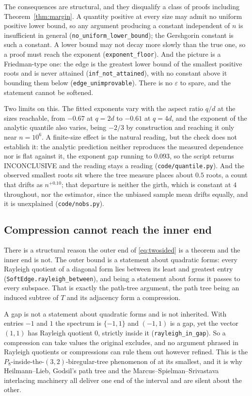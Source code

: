 \documentclass[11pt]{article}
\theoremstyle{remark}
\begin{document}
The consequences are structural, and they disqualify a class of proofs including
Theorem~\ref{thm:margin}. A quantity positive at every size may admit no uniform positive lower
bound, so any argument producing a constant independent of $n$ is insufficient in general
(\texttt{no\_uniform\_lower\_bound}); the Gershgorin constant is such a constant. A lower bound
may not decay more slowly than the true one, so a proof must reach the exponent
(\texttt{exponent\_floor}). And the picture is a Friedman-type one: the edge is the greatest lower
bound of the smallest positive roots and is never attained (\texttt{inf\_not\_attained}), with no
constant above it bounding them below (\texttt{edge\_unimprovable}). There is no $\varepsilon$ to
spare, and the statement cannot be softened.

Two limits on this. The fitted exponents vary with the aspect ratio $q/d$ at the sizes reachable,
from $-0.67$ at $q=2d$ to $-0.61$ at $q=4d$, and the exponent of the analytic quantile also varies,
being $-2/3$ by construction and reaching it only near $n=10^6$. A finite-size effect is the natural
reading, but the check does not establish it: the analytic prediction neither reproduces the measured
dependence nor is flat against it, the exponent gap running to $0.093$, so the script returns
INCONCLUSIVE and the reading stays a reading (\texttt{code/quantile.py}). And the observed smallest roots sit where the tree measure
places about $0.5$ roots, a count that drifts as $n^{+0.10}$; that departure is neither the girth,
which is constant at $4$ throughout, nor the estimator, since the unbiased sample mean drifts
equally, and it is unexplained (\texttt{code/nobs.py}).

\subsection{Compression cannot reach the inner end}\label{sec:barrier}

There is a structural reason the outer end of \eqref{eq:twosided} is a theorem and the inner end
is not. The outer bound is a statement about quadratic forms: every Rayleigh quotient of a
diagonal form lies between its least and greatest entry (\texttt{SoftEdge.rayleigh\_between}), and
being a statement about forms it passes to every subspace. That is exactly the path-tree
argument, the path tree being an induced subtree of $T$ and its adjacency form a compression.

A gap is not a statement about quadratic forms and is not inherited. With entries $-1$ and $1$
the spectrum is $\{-1,1\}$ and $(-1,1)$ is a gap, yet the vector $(1,1)$ has Rayleigh quotient
$0$, strictly inside it (\texttt{rayleigh\_in\_gap}). So a compression can take values the
original excludes, and no argument phrased in Rayleigh quotients or compressions can rule them
out however refined. This is the $P_8$-inside-the-$(3,2)$-biregular-tree phenomenon of
\cite{PartI} at its smallest, and it is why Heilmann--Lieb, Godsil's path tree and the
Marcus--Spielman--Srivastava interlacing machinery all deliver one end of the interval and are
silent about the other.
\end{document}
